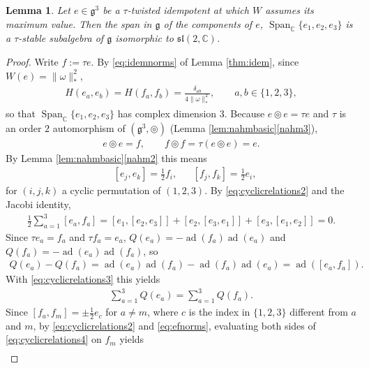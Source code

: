 \documentclass[leqno,10pt]{amsart}
\newtheorem{lemma}[theorem]{Lemma}%
\theoremstyle{definition}
\numberwithin{equation}{section}
\newcommand{\tmlt}{\circledcirc}
\newcommand{\om}{\omega}
\newcommand{\spn}{\operatorname{Span}}
\newcommand{\sll}{\mathfrak{sl}}
\newcommand{\g}{\mathfrak{g}}
\newcommand{\ad}{\operatorname{ad}}
\newcommand{\com}{\mathbb C}
\newcommand{\comass}[1]{\lVert #1\rVert_{\ast}}%
\newcommand{\qad}{Q}
\begin{document}
\begin{lemma}\label{lem:rigidity}
Let $e\in \g^{3}$ be a $\tau$-twisted idempotent at which $W$ assumes its maximum value. Then the span in $\g$ of the components of $e$, $\spn_{\com}\{e_{1}, e_{2}, e_{3}\}$ is a $\tau$-stable subalgebra of $\g$ isomorphic to $\sll(2, \com)$.
\end{lemma}
\begin{proof}
Write $f := \tau e$. By \eqref{eq:idemnorms} of Lemma \ref{thm:idem}, since $W(e) = \comass{\om}^{2}$,
\begin{align}\label{eq:efnorms}
H(e_{a}, e_{b}) = H(f_{a}, f_{b}) = \frac{\delta_{ab}}{4\comass{\om}^{2}}, \qquad a, b \in \{1, 2, 3\},
\end{align}
so that $\spn_{\com}\{e_{1}, e_{2}, e_{3}\}$ has complex dimension $3$. Because $e \tmlt e = \tau e$ and $\tau$ is an order $2$ automorphism of $(\g^{3}, \tmlt)$ (Lemma \ref{lem:nahmbasic}\ref{nahm3}),
\begin{align}\label{eq:cyclicrelations}
e \tmlt e = f, \qquad f \tmlt f = \tau(e \tmlt e) = e.
\end{align}
By Lemma \ref{lem:nahmbasic}\ref{nahm2} this means
\begin{align}\label{eq:cyclicrelations2}
&[e_{j}, e_{k}] = \tfrac{1}{2}f_{i}, && [f_{j}, f_{k}] = \tfrac{1}{2}e_{i},
\end{align}
for $(i, j, k)$ a cyclic permutation of $(1, 2, 3)$.
By \eqref{eq:cyclicrelations2} and the Jacobi identity,
\begin{align}\label{eq:cyclicrelations3}
\tfrac{1}{2}\sum_{a=1}^{3}[e_{a}, f_{a}] = [e_{1}, [e_{2}, e_{3}]] + [e_{2}, [e_{3}, e_{1}]] + [e_{3}, [e_{1}, e_{2}]] = 0.
\end{align}
Since $\tau e_{a} = f_{a}$ and $\tau f_{a} = e_{a}$, $\qad(e_{a}) = -\ad(f_{a})\ad(e_{a})$ and $\qad(f_{a}) = -\ad(e_{a})\ad(f_{a})$, so
\begin{align}
\qad(e_{a}) - \qad(f_{a}) = \ad(e_{a})\ad(f_{a}) - \ad(f_{a})\ad(e_{a}) = \ad([e_{a}, f_{a}]).
\end{align}
With \eqref{eq:cyclicrelations3} this yields
\begin{align}\label{eq:cyclicrelations4}
\sum_{a=1}^{3}\qad(e_{a}) = \sum_{a=1}^{3}\qad(f_{a}).
\end{align}
Since $[f_{a}, f_{m}] = \pm\tfrac{1}{2}e_{c}$ for $a \neq m$, where $c$ is the index in $\{1, 2, 3\}$ different from $a$ and $m$, by \eqref{eq:cyclicrelations2} and \eqref{eq:efnorms}, evaluating both sides of \eqref{eq:cyclicrelations4} on $f_{m}$ yields
\begin{align}\label{eq:sumrule}

\end{align}
\end{proof}
\end{document}
